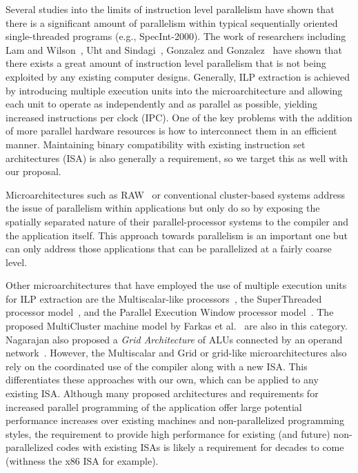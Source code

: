 \documentclass[10pt,dvips]{article}
\begin{document}
Several studies into the limits of instruction level 
parallelism have shown that there is 
a significant amount of parallelism within
typical sequentially oriented single-threaded programs
(e.g., SpecInt-2000).  
The work of researchers including 
Lam and Wilson~\cite{Lam92},
Uht and Sindagi~\cite{Uht95},
Gonzalez and Gonzalez~\cite{Gon97}
have shown that there exists a great amount of instruction level
parallelism that is not being exploited by any existing
computer designs.
Generally, ILP extraction is achieved by introducing multiple
execution units into the microarchitecture and allowing each unit
to operate as independently and as parallel as possible, yielding
increased instructions per clock (IPC).
One of the key problems with the addition of more parallel hardware
resources
is how to interconnect them in an efficient manner.
Maintaining binary compatibility with existing instruction
set architectures (ISA) is also generally a requirement, so we
target this as well with our proposal.

Microarchitectures such as RAW~\cite{waingold97,taylor02}
or conventional cluster-based systems
address the issue of parallelism within applications but only do so
by exposing the spatially separated nature of their
parallel-processor systems to the compiler and the application itself.
This approach towards parallelism is an important one but
can only address those applications that can be parallelized at
a fairly coarse level.

Other microarchitectures that have employed the
use of multiple execution units for ILP extraction are the Multiscalar-like
processors~\cite{Sohi95,sundararaman97multiscalar},
the SuperThreaded processor model~\cite{tsai96superthread},
and
the Parallel Execution Window processor model~\cite{kemp96pew}.
The proposed MultiCluster machine model by 
Farkas et al.~\cite{farkas97multicluster} are also in this category.
Nagarajan also proposed a {\em Grid Architecture} of ALUs
connected by an operand network~\cite{Nag01}.  
However, the Multiscalar and Grid or grid-like microarchitectures
also rely on the
coordinated use of the compiler along with a new ISA.
This differentiates these approaches with our own, which can be
applied to any existing ISA.
Although many proposed architectures and requirements for increased parallel
programming of the application offer large potential performance increases
over existing machines and non-parallelized programming styles,
the requirement to provide high performance for existing (and future)
non-parallelized
codes with existing ISAs is likely a requirement for decades to come
(withness the x86 ISA for example).
\end{document}
